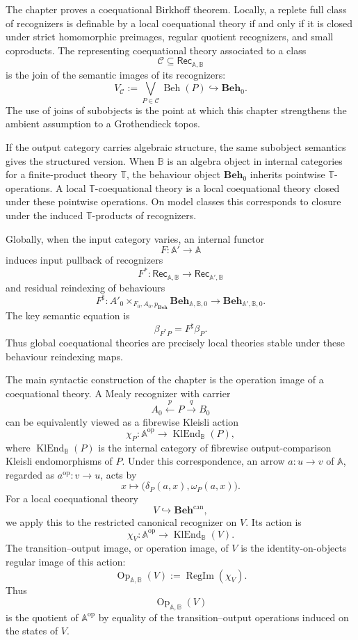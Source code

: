 The chapter proves a coequational Birkhoff theorem. Locally, a replete full
class of recognizers is definable by a local coequational theory if and only if
it is closed under strict homomorphic preimages, regular quotient recognizers,
and small coproducts. The representing coequational theory associated to a
class
\[
    \mathcal C\subseteq\mathsf{Rec}_{\mathbb A,\mathbb B}
\]
is the join of the semantic images of its recognizers:
\[
    V_{\mathcal C}
    :=
    \bigvee_{P\in\mathcal C}\operatorname{Beh}(P)
    \hookrightarrow \mathbf{Beh}_0.
\]
The use of joins of subobjects is the point at which this chapter strengthens
the ambient assumption to a Grothendieck topos.

If the output category carries algebraic structure, the same subobject
semantics gives the structured version. When \(\mathbb B\) is an algebra
object in internal categories for a finite-product theory \(\mathbb T\), the
behaviour object \(\mathbf{Beh}_0\) inherits pointwise \(\mathbb T\)-operations.
A local \(\mathbb T\)-coequational theory is a local coequational theory closed
under these pointwise operations. On model classes this corresponds to closure
under the induced \(\mathbb T\)-products of recognizers.

Globally, when the input category varies, an internal functor
\[
    F:\mathbb A'\to\mathbb A
\]
induces input pullback of recognizers
\[
    F^*:\mathsf{Rec}_{\mathbb A,\mathbb B}
    \to
    \mathsf{Rec}_{\mathbb A',\mathbb B}
\]
and residual reindexing of behaviours
\[
    F^\sharp:
    A'_0\times_{F_0,A_0,p_{\mathbf{Beh}}}
    \mathbf{Beh}_{\mathbb A,\mathbb B,0}
    \to
    \mathbf{Beh}_{\mathbb A',\mathbb B,0}.
\]
The key semantic equation is
\[
    \beta_{F^*P}=F^\sharp\beta_P.
\]
Thus global coequational theories are precisely local theories stable under
these behaviour reindexing maps.

The main syntactic construction of the chapter is the operation image of a
coequational theory. A Mealy recognizer with carrier
\[
    A_0\xleftarrow{p}P\xrightarrow{q}B_0
\]
can be equivalently viewed as a fibrewise Kleisli action
\[
    \chi_P:
    \mathbb A^{\mathrm{op}}
    \longrightarrow
    \operatorname{KlEnd}_{\mathbb B}(P),
\]
where \(\operatorname{KlEnd}_{\mathbb B}(P)\) is the internal category of
fibrewise output-comparison Kleisli endomorphisms of \(P\). Under this
correspondence, an arrow \(a:u\to v\) of \(\mathbb A\), regarded as
\(a^{\mathrm{op}}:v\to u\), acts by
\[
    x\longmapsto
    \bigl(\delta_P(a,x),\omega_P(a,x)\bigr).
\]
For a local coequational theory
\[
    V\hookrightarrow \mathbf{Beh}^{\mathrm{can}},
\]
we apply this to the restricted canonical recognizer on \(V\). Its action is
\[
    \chi_V:
    \mathbb A^{\mathrm{op}}
    \longrightarrow
    \operatorname{KlEnd}_{\mathbb B}(V).
\]
The transition--output image, or operation image, of \(V\) is the
identity-on-objects regular image of this action:
\[
    \operatorname{Op}_{\mathbb A,\mathbb B}(V)
    :=
    \operatorname{RegIm}(\chi_V).
\]
Thus
\[
    \operatorname{Op}_{\mathbb A,\mathbb B}(V)
\]
is the quotient of \(\mathbb A^{\mathrm{op}}\) by equality of the
transition--output operations induced on the states of \(V\).

